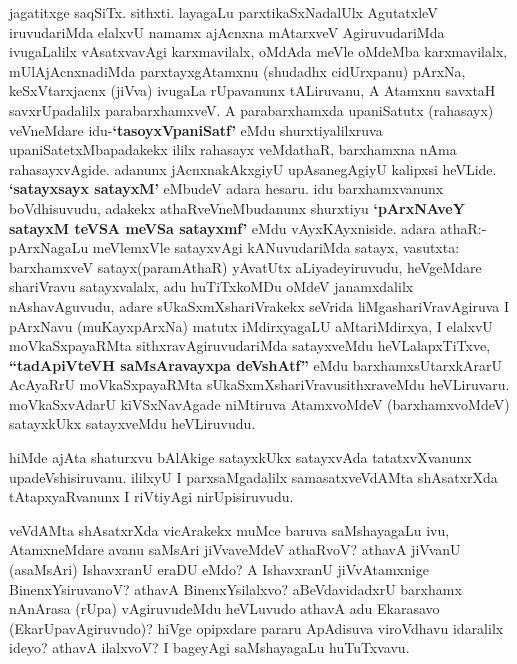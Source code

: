 

\begin{artha}
jagatitxge saqSiTx. sithxti. layagaLu parxtikaSxNadalUlx AgutatxleV
iruvudariMda elalxvU namamx ajAcnxna mAtarxveV AgiruvudariMda
ivugaLalilx vAsatxvavAgi karxmavilalx, oMdAda meVle
oMdeMba karxmavilalx, mUlAjAcnxnadiMda parxtayxgAtamxnu (shudadhx
cidUrxpanu) pArxNa, keSxVtarxjacnx (jiVva) ivugaLa rUpavanunx
tALiruvanu, A Atamxnu savxtaH savxrUpadalilx parabarxhamxveV. A
parabarxhamxda upaniSatutx (rahasayx) veVneMdare idu-\textbf{`tasoyxVpaniSatf'}
eMdu shurxtiyalilxruva upaniSatetxMbapadakekx ililx rahasayx veMdathaR,
barxhamxna nAma rahasayxvAgide. adanunx jAcnxnakAkxgiyU upAsanegAgiyU
kalipxsi heVLide. \textbf{`satayxsayx satayxM'} eMbudeV adara hesaru. idu
barxhamxvanunx boVdhisuvudu, adakekx athaRveVneMbudanunx shurxtiyu
\textbf{`pArxNAveY satayxM teVSA meVSa satayxmf'} eMdu
vAyxKAyxniside. adara athaR:- pArxNagaLu meVlemxVle satayxvAgi
kANuvudariMda satayx, vasutxta: barxhamxveV satayx(paramAthaR)
yAvatUtx aLiyadeyiruvudu, heVgeMdare shariVravu satayxvalalx, adu
huTiTxkoMDu oMdeV janamxdalilx nAshavAguvudu, adare
sUkaSxmXshariVrakekx seVrida liMgashariVravAgiruva I pArxNavu
(muKayxpArxNa) matutx iMdirxyagaLU aMtariMdirxya, I elalxvU
moVkaSxpayaRMta sithxravAgiruvudariMda satayxveMdu heVLalapxTiTxve,
\textbf{``tadApiVteVH saMsAravayxpa deVshAtf''} eMdu
barxhamxsUtarxkArarU  AcAyaRrU moVkaSxpayaRMta
sUkaSxmXshariVravusithxraveMdu heVLiruvaru. moVkaSxvAdarU kiVSxNavAgade
niMtiruva AtamxvoMdeV (barxhamxvoMdeV) satayxkUkx satayxveMdu
heVLiruvudu.  
\end{artha}

\begin{artha}
hiMde ajAta shaturxvu bAlAkige satayxkUkx satayxvAda tatatxvXvanunx
upadeVshisiruvanu. ililxyU I parxsaMgadalilx samasatxveVdAMta
shAsatxrXda tAtapxyaRvanunx I riVtiyAgi nirUpisiruvudu.
\end{artha}



\begin{artha}
veVdAMta shAsatxrXda vicArakekx muMce baruva saMshayagaLu ivu,
AtamxneMdare avanu saMsAri jiVvaveMdeV athaRvoV? athavA
jiVvanU (asaMsAri) IshavxranU eraDU eMdo? A IshavxranU jiVvAtamxnige
BinenxYsiruvanoV? athavA BinenxYsilalxvo? aBeVdavidadxrU barxhamx
nAnArasa (rUpa) vAgiruvudeMdu heVLuvudo athavA adu
Ekarasavo (EkarUpavAgiruvudo)? hiVge opipxdare pararu ApAdisuva
viroVdhavu idaralilx ideyo? athavA ilalxvoV? I bageyAgi saMshayagaLu huTuTxvavu.
\end{artha}

